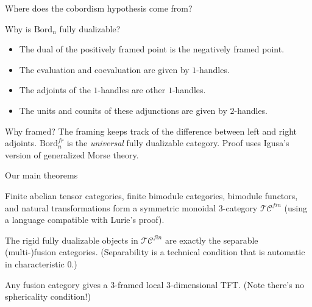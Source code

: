 \documentclass[beamer]{beamer}
\begin{document}
\begin{frame}{Where does the cobordism hypothesis come from?}
\begin{block}{Why is $\mathrm{Bord}_n$ fully dualizable?}
\begin{itemize}
\item The dual of the positively framed point is the negatively framed point.
\item The evaluation and coevaluation are given by $1$-handles.
\item The adjoints of the $1$-handles are other $1$-handles.
\item The units and counits of these adjunctions are given by $2$-handles.
\end{itemize}
\end{block}

\begin{block}{Why framed?}
The framing keeps track of the difference between left and right adjoints.  $\mathrm{Bord}_n^{fr}$ is the {\em universal} fully dualizable category.  Proof uses Igusa's version of generalized Morse theory.
\end{block}
\end{frame}

\begin{frame}{Our main theorems}
\begin{theorem}[DSPS]
Finite abelian tensor categories, finite bimodule categories, bimodule functors, and natural transformations form a symmetric monoidal $3$-category $\mathcal{TC}^{fin}$ (using a language compatible with Lurie's proof).
\end{theorem}

\begin{theorem}[DSPS]
The rigid fully dualizable objects in $\mathcal{TC}^{fin}$ are exactly the separable (multi-)fusion categories.  (Separability is a technical condition that is automatic in characteristic $0$.)
\end{theorem}

\begin{corollary}
Any fusion category gives a $3$-framed local $3$-dimensional TFT.  (Note there's no sphericality condition!)
\end{corollary}
\end{frame}
\end{document}
